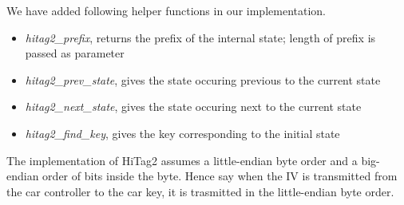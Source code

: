 We have added following helper functions in our implementation.
\begin{itemize}
\item \textit{hitag2\_prefix}, returns the prefix of the internal state; length of prefix is passed as parameter
\item \textit{hitag2\_prev\_state}, gives the state occuring previous to the current state
\item \textit{hitag2\_next\_state}, gives the state occuring next to the current state
\item \textit{hitag2\_find\_key}, gives the key corresponding to the initial state
\end{itemize}

The implementation of HiTag2 assumes a little-endian byte order and a big-endian order of bits inside the byte. Hence say when the IV is transmitted from the car controller to the car key, it is trasmitted in the little-endian byte order. 
